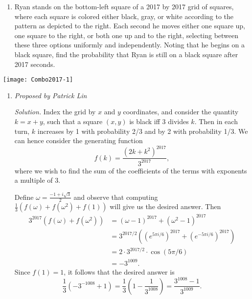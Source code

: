 \documentclass[10pt]{article}
\newcounter{enum}
\newcommand{\proposed}[1]
{
\vspace{5pt}
\noindent\textit{Proposed by #1}
}
\newcommand{\solution}
{
\vspace{5pt}
\noindent\textit{Solution.}\qquad
}
\begin{document}
\hspace*{-\parindent}%
\begin{minipage}{0.80\textwidth}
\begin{enumerate}
\setcounter{enumi}{\theenum}
\item Ryan stands on the bottom-left square of a 2017 by 2017 grid of squares, where each square is colored either black, gray, or white according to the pattern as depicted to the right. Each second he moves either one square up, one square to the right, or both one up and to the right, selecting between these three options uniformly and independently. Noting that he begins on a black square, find the probability that Ryan is still on a black square after 2017 seconds.
\setcounter{enum}{\theenumi}
\end{enumerate}

\end{minipage} \hfill
\begin{minipage}{0.17\textwidth}
\centering
\vspace{-7pt}
\texttt{[image: Combo2017-1]}
\end{minipage}

\begin{enumerate}
\item[] \proposed{Patrick Lin}

\solution Index the grid by $x$ and $y$ coordinates, and consider the quantity $k = x + y$, such that a square $(x,y)$ is black iff 3 divides $k$. Then in each turn, $k$ increases by 1 with probability 2/3 and by 2 with probability 1/3. We can hence consider the generating function
\[f(k) = \frac{(2k+k^2)^{2017}}{3^{2017}},\]
where we wish to find the sum of the coefficients of the terms with exponents a multiple of 3.

\par Define $\omega = \frac{-1+i\sqrt{3}}{2}$ and observe that computing $\frac13(f(\omega) + f(\omega^2) + f(1))$ will give us the desired answer. Then
\begin{align*}
3^{2017}(f(\omega) + f(\omega^2)) & = (\omega-1)^{2017} + (\omega^2 - 1)^{2017} \\
& = 3^{2017/2}((e^{5\pi i/6})^{2017} + (e^{-5\pi i/6})^{2017}) \\
& = 2 \cdot 3^{2017/2} \cdot \cos(5\pi/6) \\
& = -3^{1009}.
\end{align*}
Since $f(1) = 1$, it follows that the desired answer is
\[\frac13(-3^{-1008} + 1) = \frac13\left(1 - \frac{1}{3^{1008}}\right) = \boxed{\frac{3^{1008}-1}{3^{1009}}}.\]
\end{enumerate}
\end{document}
